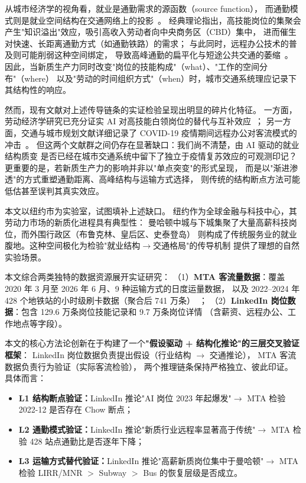 \documentclass[runningheads]{llncs}
\begin{document}
从城市经济学的视角看，就业是通勤需求的源函数（source function），
而通勤模式则是就业空间结构在交通网络上的投影~\cite{glaeser2001}。
经典理论指出，高技能岗位的集聚会产生"知识溢出"效应，吸引高收入劳动者向中央商务区（CBD）集中，
进而催生对快速、长距离通勤方式（如通勤铁路）的需求；
与此同时，远程办公技术的普及则可能削弱这种空间绑定，
导致高峰通勤的扁平化与短途公共交通的萎缩~\cite{dingel2020,salon2022,bloom2023}。
因此，当新质生产力同时改变"岗位的技能构成"（what）、"工作的空间分布"（where）
以及"劳动的时间组织方式"（when）时，城市交通系统理应记录下其结构性的响应。

然而，现有文献对上述传导链条的实证检验呈现出明显的碎片化特征。
一方面，劳动经济学研究已充分证实 AI 对高技能白领岗位的替代与互补效应~\cite{acemoglu2018,acemoglu2020,autor2015,frey2017}；
另一方面，交通与城市规划文献详细记录了 COVID-19 疫情期间远程办公对客流模式的冲击~\cite{beck2020,brough2021,devos2020,tirachini2020}。
但这两个文献群之间仍存在显著缺口：我们尚不清楚，由 AI 驱动的就业结构质变
是否已经在城市交通系统中留下了独立于疫情复苏效应的可观测印记？
更重要的是，若新质生产力的影响并非以"单点突变"的形式呈现，
而是以"渐进渗透"的方式重塑通勤距离、高峰结构与运输方式选择，
则传统的结构断点方法可能低估甚至误判其真实效应。

本文以纽约市为实验室，试图填补上述缺口。
纽约作为全球金融与科技中心，其劳动力市场的新质化进程具有典型性：
曼哈顿中城与下城集聚了大量高薪科技岗位，而外围行政区（布鲁克林、皇后区、史泰登岛）
则构成了传统服务业的就业腹地。这种空间极化为检验"就业结构$\to$交通格局"的传导机制
提供了理想的自然实验场景。

本文综合两类独特的数据资源展开实证研究：
（1）\textbf{MTA 客流量数据}：覆盖 2020 年 3 月至 2026 年 6 月、9 种运输方式的日度运量数据，
以及 2022--2024 年 428 个地铁站的小时级刷卡数据（聚合后 741 万条）~\cite{mta2024}；
（2）\textbf{LinkedIn 岗位数据}：包含 129.6 万条岗位技能记录和 9.7 万条岗位详情
（含薪资、远程办公、工作地点等字段）。

本文的核心方法论创新在于构建了一个\textbf{"假设驱动 + 结构化推论"的三层交叉验证框架}：
LinkedIn 岗位数据负责提出假设（行业结构 $\to$ 交通推论），
MTA 客流数据负责行为验证（实际客流检验），
两个推理链条保持严格独立、彼此印证。
具体而言：
\begin{itemize}
  \item \textbf{L1 结构断点验证：}LinkedIn 推论"AI 岗位 2023 年起爆发"$\to$
        MTA 检验 2022-12 是否存在 Chow 断点；
  \item \textbf{L2 通勤模式验证：}LinkedIn 推论"新质行业远程率显著高于传统"$\to$
        MTA 检验 428 站点通勤比是否逐年下降；
  \item \textbf{L3 运输方式替代验证：}LinkedIn 推论"高薪新质岗位集中于曼哈顿"$\to$
        MTA 检验 LIRR/MNR $>$ Subway $>$ Bus 的恢复层级是否成立。
\end{itemize}
\end{document}
